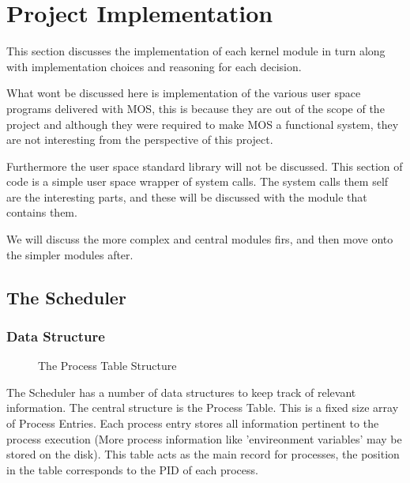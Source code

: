 \documentclass[a4paper]{report}
\begin{document}
\chapter{Project Implementation}

This section discusses the implementation of each kernel module in turn along with implementation choices and reasoning for each decision.

What wont be discussed here is implementation of the various user space programs delivered with MOS, this is because they are out of the scope of the project and although they were required to make MOS a functional system, they are not interesting from the perspective of this project.

Furthermore the user space standard library will not be discussed. This section of code is a simple user space wrapper of system calls. The system calls them self are the interesting parts, and these will be discussed with the module that contains them.

We will discuss the more complex and central modules firs, and then move onto the simpler modules after.
















\clearpage

\section{The Scheduler}


\subsection{Data Structure}

\begin{figure}[ht]
  \centering

  \def\svgwidth{\columnwidth}
  
  \caption{The Process Table Structure}
  \label{fig:schedulerscreen}
\end{figure}


The Scheduler has a number of data structures to keep track of relevant information. The central structure is the Process Table. This is a fixed size array of Process Entries. Each process entry stores all information pertinent to the process execution (More process information like 'envireonment variables' may be stored on the disk). This table acts as the main record for processes, the position in the table corresponds to the PID of each process.
\end{document}
